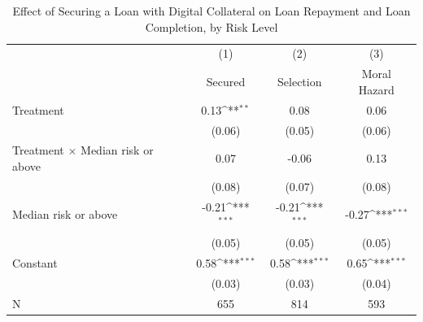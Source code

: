 \begin{table}[htbp]\centering
\def\sym#1{\ifmmode^{#1}\else\(^{#1}\)\fi}
\caption{Effect of Securing a Loan with Digital Collateral on Loan Repayment and Loan Completion, by Risk Level\label{LASMH\_complete\_riskinteract\_ITT}}
\begin{tabular}{l*{3}{c}}
\toprule
                    &\multicolumn{1}{c}{(1)}&\multicolumn{1}{c}{(2)}&\multicolumn{1}{c}{(3)}\\
                    &\multicolumn{1}{c}{Secured}&\multicolumn{1}{c}{Selection}&\multicolumn{1}{c}{Moral Hazard}\\
\midrule
Treatment           &        0.13\sym{**} &        0.08         &        0.06         \\
                    &      (0.06)         &      (0.05)         &      (0.06)         \\\addlinespace
Treatment $\times$ Median risk or above&        0.07         &       -0.06         &        0.13         \\
                    &      (0.08)         &      (0.07)         &      (0.08)         \\\addlinespace
Median risk or above&       -0.21\sym{***}&       -0.21\sym{***}&       -0.27\sym{***}\\
                    &      (0.05)         &      (0.05)         &      (0.05)         \\\addlinespace
Constant            &        0.58\sym{***}&        0.58\sym{***}&        0.65\sym{***}\\
                    &      (0.03)         &      (0.03)         &      (0.04)         \\\addlinespace
\midrule
N                   &         655         &         814         &         593         \\
\bottomrule
\end{tabular}
\end{table}
